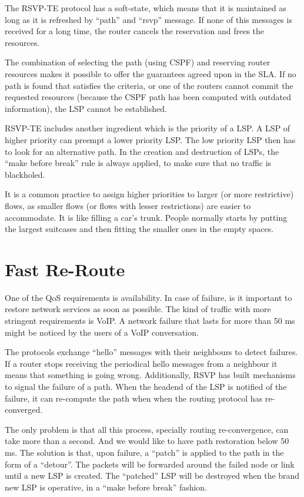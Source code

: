 The RSVP-TE protocol has a soft-state, which means that it is maintained as long as it is refreshed by ``path'' and ``rsvp'' message.
If none of this messages is received for a long time, the router cancels the reservation and frees the resources.

The combination of selecting the path (using CSPF) and reserving router resources makes it possible to offer the guarantees agreed upon in the SLA.
If no path is found that satisfies the criteria, or one of the routers cannot commit the requested resources (because the CSPF path has been computed with outdated information), the LSP cannot be established.

RSVP-TE includes another ingredient which is the priority of a LSP.
A LSP of higher priority can preempt a lower priority LSP.
The low priority LSP then has to look for an alternative path.
In the creation and destruction of LSPs, the ``make before break'' rule is always applied, to make sure that no traffic is blackholed.

It is a common practice to assign higher priorities to larger (or more restrictive) flows, as smaller flows (or flows with lesser restrictions) are easier to accommodate.
It is like filling a car's trunk. 
People normally starts by putting the largest suitcases and then fitting the smaller ones in the empty spaces.

\section{Fast Re-Route}

One of the QoS requirements is availability.
In case of failure, is it important to restore network services as soon as possible.
The kind of traffic with more stringent requirements is VoIP.
A network failure that lasts for more than 50 ms might be noticed by the users of a VoIP conversation.

The protocols exchange ``hello'' messages with their neighbours to detect failures.
If a router stops receiving the periodical hello messages from a neighbour it means that something is going wrong.
Additionally, RSVP has built mechanisms to signal the failure of a path.
When the headend of the LSP is notified of the failure, it can re-compute the path when when the routing protocol has re-converged.

The only problem is that all this process, specially routing re-convergence, can take more than a second.
And we would like to have path restoration below 50 ms.
The solution is that, upon failure, a ``patch'' is applied to the path in the form of a ``detour''.
The packets will be forwarded around the failed node or link until a new LSP is created.
The ``patched'' LSP will be destroyed when the brand new LSP is operative, in a ``make before break'' fashion.

